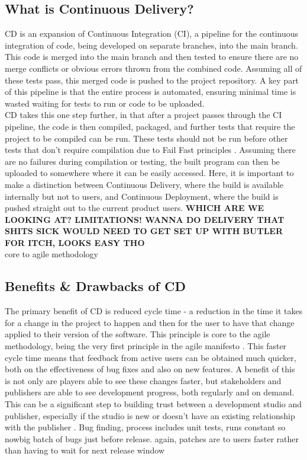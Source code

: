 \documentclass[lettersize,journal]{IEEEtran}
\begin{document}
    \subsection{What is Continuous Delivery?}
        CD is an expansion of Continuous Integration (CI), a pipeline for the continuous integration of code, being developed on separate branches, into the main branch. This code is merged into the main branch and then tested to ensure there are no merge conflicts or obvious errors thrown from the combined code. Assuming all of these tests pass, this merged code is pushed to the project repository. A key part of this pipeline is that the entire process is automated, ensuring minimal time is wasted waiting for tests to run or code to be uploaded. \cite{ContDelIntro,CICDCD} \\
        CD takes this one step further, in that after a project passes through the CI pipeline, the code is then compiled, packaged, and further tests that require the project to be compiled can be run. These tests should not be run before other tests that don't require compilation due to Fail Fast principles \cite{shore2004fail,bamboo}. Assuming there are no failures during compilation or testing, the built program can then be uploaded to somewhere where it can be easily accessed. Here, it is important to make a distinction between Continuous Delivery, where the build is available internally but not to users, and Continuous Deployment, where the build is pushed straight out to the current product users. \textbf{WHICH ARE WE LOOKING AT? LIMITATIONS! WANNA DO DELIVERY THAT SHITS SICK WOULD NEED TO GET SET UP WITH BUTLER FOR ITCH, LOOKS EASY THO} \\
        core to agile methodology \cite{agilemanifesto}

    \subsection{Benefits \& Drawbacks of CD}
        The primary benefit of CD is reduced cycle time - a reduction in the time it takes for a change in the project to happen and then for the user to have that change applied to their version of the software. This principle is core to the agile methodology, being the very first principle in the agile manifesto \cite{agilemanifesto}. This faster cycle time means that feedback from active users can be obtained much quicker, both on the effectiveness of bug fixes and also on new features. 
        A benefit of this is not only are players able to see these changes faster, but stakeholders and publishers are able to see development progress, both regularly and on demand. This can be a significant step to building trust between a development studio and publisher, especially if the studio is new or doesn't have an existing relationship with the publisher \cite{gamedevhandbook}.
        Bug finding, process includes unit tests, runs constant so nowbig batch of bugs just before release. again, patches are to users faster rather than having to wait for next release window
        
\end{document}
